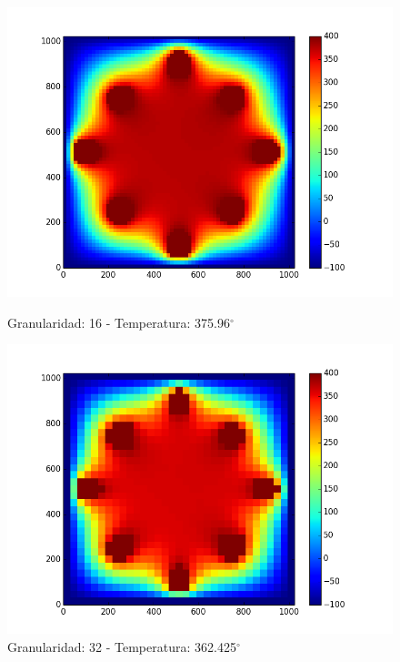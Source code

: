 \begin{figure}[htb]
\begin{center}
\includegraphics[scale=0.3]{imagenes/caso1_16.png} 
\caption{Granularidad: 16 - Temperatura: 375.96$^{\circ}$} 
        \end{center}
\endminipage\hfill
{}
\begin{center}
\includegraphics[scale=0.3]{imagenes/caso1_32.png} 
\caption{Granularidad: 32 - Temperatura: 362.425$^{\circ}$} 
        \end{center}
\endminipage\hfill 
\end{figure}

